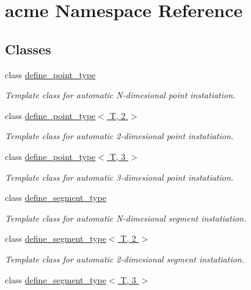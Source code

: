 \hypertarget{namespaceacme}{}\section{acme Namespace Reference}
\label{namespaceacme}
\subsection*{Classes}
\begin{DoxyCompactItemize}
\item 
class \hyperlink{classacme_1_1define__point__type}{define\+\_\+point\+\_\+type}
\begin{DoxyCompactList}\small\item\em Template class for automatic N-\/dimesional point instatiation. \end{DoxyCompactList}\item 
class \hyperlink{classacme_1_1define__point__type_3_01_t_00_012_01_4}{define\+\_\+point\+\_\+type$<$ T, 2 $>$}
\begin{DoxyCompactList}\small\item\em Template class for automatic 2-\/dimesional point instatiation. \end{DoxyCompactList}\item 
class \hyperlink{classacme_1_1define__point__type_3_01_t_00_013_01_4}{define\+\_\+point\+\_\+type$<$ T, 3 $>$}
\begin{DoxyCompactList}\small\item\em Template class for automatic 3-\/dimesional point instatiation. \end{DoxyCompactList}\item 
class \hyperlink{classacme_1_1define__segment__type}{define\+\_\+segment\+\_\+type}
\begin{DoxyCompactList}\small\item\em Template class for automatic N-\/dimesional segment instatiation. \end{DoxyCompactList}\item 
class \hyperlink{classacme_1_1define__segment__type_3_01_t_00_012_01_4}{define\+\_\+segment\+\_\+type$<$ T, 2 $>$}
\begin{DoxyCompactList}\small\item\em Template class for automatic 2-\/dimesional segment instatiation. \end{DoxyCompactList}\item 
class \hyperlink{classacme_1_1define__segment__type_3_01_t_00_013_01_4}{define\+\_\+segment\+\_\+type$<$ T, 3 $>$}

\end{DoxyCompactItemize}
